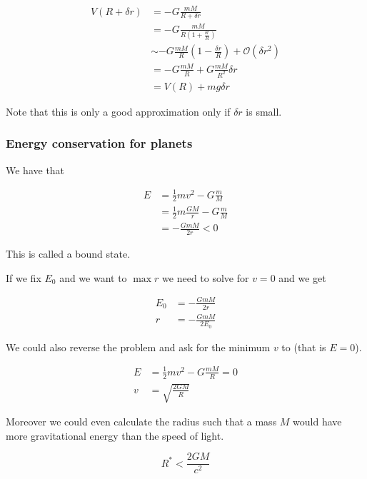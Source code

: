 \documentclass[10pt]{extarticle}
\begin{document}
\begin{align*}
    V(R + \delta r) & = - G \frac{m M}{R + \delta r}                                            \\
                    & = - G \frac{m M}{R (1 + \frac{\delta r}{R})}                              \\
                    & \sim - G \frac{m M}{R} (1 - \frac{\delta r}{R}) + \mathcal{O}(\delta r^2) \\
                    & = - G \frac{m M}{R} + G \frac{m M}{R^2} \delta r                          \\
                    & = V(R) + m g \delta r
\end{align*}

Note that this is only a good approximation only if $\delta r$ is small.

\subsubsection{Energy conservation for planets}

We have that

\begin{align*}
    E & = \frac{1}{2} m v^2 - G \frac{m}{M}           \\
      & = \frac{1}{2} m \frac{G M}{r} - G \frac{m}{M} \\
      & = - \frac{G m M}{2 r} < 0
\end{align*}

This is called a bound state.

If we fix $E_0$ and we want to $\max r$ we need to solve for $v = 0$ and we get

\begin{align*}
    E_0 & = - \frac{G m M}{2 r}   \\
    r   & = - \frac{G m M}{2 E_0}
\end{align*}

We could also reverse the problem and ask for the minimum $v$ to  (that is $E = 0$).

\begin{align*}
    E & = \frac{1}{2} m v^2 - G \frac{mM}{R} = 0 \\
    v & = \sqrt{\frac{2 G M}{R}}
\end{align*}

Moreover we could even calculate the radius such that a mass $M$ would have more gravitational energy than the speed of light.

$$
    R^* < \frac{2 G M}{c^2}
$$
\end{document}
